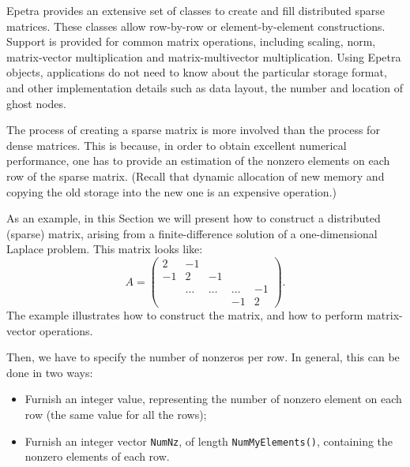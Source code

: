 \documentclass[10pt,relax]{SANDreport}
\begin{document}
\smallskip

Epetra provides an extensive set of classes to create and fill
distributed sparse matrices. These classes allow row-by-row or
element-by-element constructions. Support is provided for common matrix
operations, including scaling, norm, matrix-vector multiplication and
matrix-multivector multiplication.
Using Epetra objects, applications do not need to know about the
particular storage format, and other implementation details such as data
layout, the number and location of ghost nodes. 

The process of creating a sparse matrix is more involved than the
process for dense matrices. This is because, in order to obtain
excellent numerical performance, one has to provide an estimation of
the nonzero elements on each row of the sparse matrix. (Recall that
dynamic allocation of new memory and copying the old storage into the
new one is an expensive operation.)

As an example, in this Section we will present how to construct a
distributed (sparse) matrix, arising from a finite-difference solution
of a one-dimensional Laplace problem. This matrix looks like:
\begin{equation*}
A = \begin{pmatrix}
 2 & -1 &     &   &    \\
-1 &  2     & -1     &        &    \\
   & \ldots & \ldots & \ldots & -1 \\
   &        &        & -1     & 2
\end{pmatrix}.
\end{equation*}
The example illustrates how to construct the matrix,
and how to perform matrix-vector operations.

Then, we have to specify the number
of nonzeros per row. In general, this can be done in two ways:
\begin{itemize}
\item Furnish an integer value, representing the number of nonzero
  element on each row (the same value for all the rows);
\item Furnish an integer vector \verb!NumNz!, of length
  \verb!NumMyElements()!, containing the nonzero elements of each row.
\end{itemize}
\end{document}

